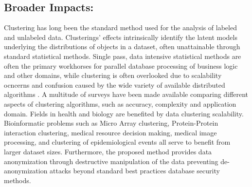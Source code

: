 \documentclass[a4paper,10pt]{article}
\begin{document}
\subsection*{Broader Impacts:} Clustering has long been the standard method
used for the analysis of labeled and unlabeled data.  Clusterings' effects
intrinsically identify the latent models underlying the distributions
of objects in a dataset, often unattainable through standard statistical
methods.  Single pass, data intensive statistical methods are often the
primary workhorses for parallel database processing of business logic and
other domains, while clustering is often overlooked due to scalability
ocncerns and confusion caused by the wide variety of available distributed
algorithms \cite{clusters}.  A multitude of surveys \cite{clusters} have
been made available comparing different aspects of clustering algorithms,
such as accuracy, complexity and application domain.  Fields in health and
biology are benefited by data clustering scalability.  Bioinformatic problems 
such as Micro Array clustering, Protein-Protein interaction clustering, medical
resource decision making, medical image processing, and clustering of 
epidemiological events all serve to benefit from larger dataset sizes. 
Furthermore, the proposed method provides data anonymization through destructive manipulation of the data preventing de-anonymization attacks beyond standard 
best practices database security methods.
\newpage
{}
\setcounter{section}{0}
\pagestyle{plain}
\end{document}
